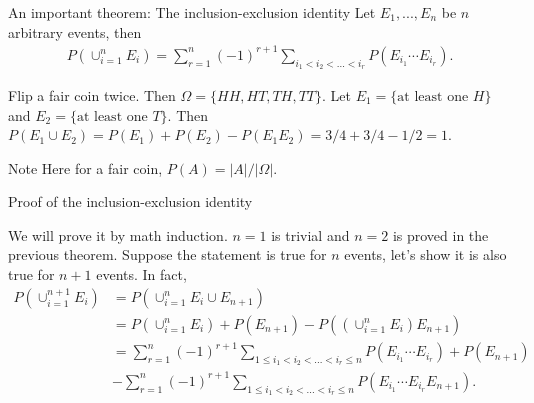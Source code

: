 \begin{frame}{An important theorem:  The inclusion-exclusion identity}
	 Let $E_1,...,E_n$ be $n$ arbitrary events, then
	\begin{align*}
		P(\cup_{i=1}^n E_i)=\sum_{r=1}^n (-1)^{r+1}\sum_{i_1<i_2<...<i_r}P(E_{i_1}\cdots E_{i_r}).
	\end{align*}
	\et
	\begin{example}
		Flip a fair coin twice. Then $\Omega=\{HH,HT,TH,TT\}$. Let $E_1=\{\text{at least one $H$}\}$ and $E_2=\{\text{at least one $T$}\}$.  Then $P(E_1\cup E_2)=P(E_1)+P(E_2)-P(E_1E_2)=3/4+3/4-1/2=1.$
		
		Note Here for a fair coin, $P(A)=|A|/|\Omega|$.
	\end{example}
	
	
\end{frame}


\begin{frame}{Proof of the inclusion-exclusion identity}

			We will prove it by math induction. $n=1$ is trivial and $n=2$ is proved in the previous theorem. Suppose the statement is true for $n$ events, let's show it is also true for $n+1$ events. In fact, 
			\begin{align*}
				P(\cup_{i=1}^{n+1} E_i)&=P(\cup_{i=1}^n E_i\cup E_{n+1})\\
				&=P(\cup_{i=1}^n E_i)+P(E_{n+1})-P((\cup_{i=1}^n E_i)E_{n+1})\\
				&=\sum_{r=1}^n (-1)^{r+1}\sum_{1\leq i_1<i_2<...<i_r\leq n}P(E_{i_1}\cdots E_{i_r})+P(E_{n+1})\\
				&-\sum_{r=1}^n (-1)^{r+1}\sum_{1\leq i_1<i_2<...<i_r\leq n}P(E_{i_1}\cdots E_{i_r}E_{n+1}).
			\end{align*}

		

\end{frame}

